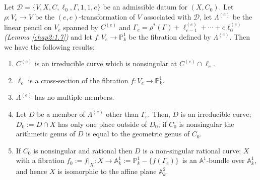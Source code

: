 \subsection{}\label{chap2:1.11}
\begin{lemma*}
  Let $\mathscr{D}=\{V,X,C,\ell_{0},\Gamma,1,1,e\}$ be an admissible
  datum for $(X,C_{0})$. Let $\rho:V_{e}\to V$ be the
  $(e,e)$-transformation of $V$ associated with $\mathscr{D}$, let
  $\Lambda^{(e)}$ be the linear pencil on $V_{e}$ spanned by $C^{(e)}$
  and
  $\Gamma_{e}=\rho^{\ast}(\Gamma)+\ell^{(e)}_{e-1}+\cdots+e\ell_{0}^{(e)}$
  {\em (\cf Lemma \ref{chap2:1.7})} and let $f:V_{e}\to \mathbb{P}^{1}_{k}$
  be the fibration defined by $\Lambda^{(e)}$. Then we have the
  following results:
  \begin{enumerate}
    \renewcommand{\labelenumi}{\rm(\theenumi)}
  \item $C^{(e)}$ is an irreducible curve which is nonsingular at
    $C^{(e)}\cap \ell_{e}$.
    
  \item $\ell_{e}$ is a cross-section of the fibration $f:V_{e}\to
    \mathbb{P}^{1}_{k}$. 
    
  \item $\Lambda^{(e)}$ has no multiple members.
    
  \item Let $D$ be a member of $\Lambda^{(e)}$ other than
    $\Gamma_{e}$. Then, $D$ is an irreducible curve; $D_{0}:=D\cap X$
    has only one place outside of $D_{0}$; if $C_{0}$ is nonsingular the
    arithmetic genus of $D$ is equal to the geometric genus of $C_{0}$.
    
  \item If $C_{0}$ is nonsingular and rational then $D$ is a
    non-singular rational curve; $X$ with a fibration
    $f_{0}:=f|_{X}:X\to
    \mathbb{A}^{1}_{k}:=\mathbb{P}^{1}_{k}-\{f(\Gamma_{e})\}$\pageoriginale\
    is an $\mathbb{A}^{1}$-bundle over $\mathbb{A}^{1}_{k}$, and hence
    $X$ is isomorphic to the affine plane $\mathbb{A}^{2}_{k}$. 
  \end{enumerate}
\end{lemma*}

